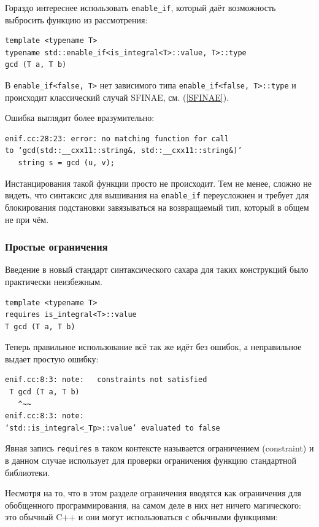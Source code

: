 \documentclass[a4paper,12pt,oneside]{article}
\begin{document}
Гораздо интереснее использовать \lstinline!enable_if!, который даёт возможность выбросить функцию из рассмотрения:

\begin{lstlisting}
template <typename T>
typename std::enable_if<is_integral<T>::value, T>::type
gcd (T a, T b)
\end{lstlisting}

В \lstinline!enable_if<false, T>! нет зависимого типа \lstinline!enable_if<false, T>::type! и происходит классический случай SFINAE, см. (\ref{SFINAE}).

Ошибка выглядит более вразумительно:

\begin{verbatim}
enif.cc:28:23: error: no matching function for call 
to ‘gcd(std::__cxx11::string&, std::__cxx11::string&)’
   string s = gcd (u, v);
\end{verbatim}

Инстанцирования такой функции просто не происходит. Тем не менее, сложно не видеть, что синтаксис для вышивания на \lstinline!enable_if! переусложнен и требует для блокирования подстановки завязываться на возвращаемый тип, который в общем не при чём.

\subsubsection{Простые ограничения}\label{Constraints}

Введение в новый стандарт синтаксического сахара для таких конструкций было практически неизбежным.

\begin{lstlisting}
template <typename T>
requires is_integral<T>::value
T gcd (T a, T b)
\end{lstlisting}

Теперь правильное использование всё так же идёт без ошибок, а неправильное выдает простую ошибку:

\begin{verbatim}
enif.cc:8:3: note:   constraints not satisfied
 T gcd (T a, T b)
   ^~~
enif.cc:8:3: note:   
‘std::is_integral<_Tp>::value’ evaluated to false
\end{verbatim}

Явная запись \lstinline!requires! в таком контексте называется ограничением (constraint) и в данном случае использует для проверки ограничения функцию стандартной библиотеки.

Несмотря на то, что в этом разделе ограничения вводятся как ограничения для обобщенного программирования, на самом деле в них нет ничего магического: это обычный C++ и они могут использоваться с обычными функциями:
\end{document}
